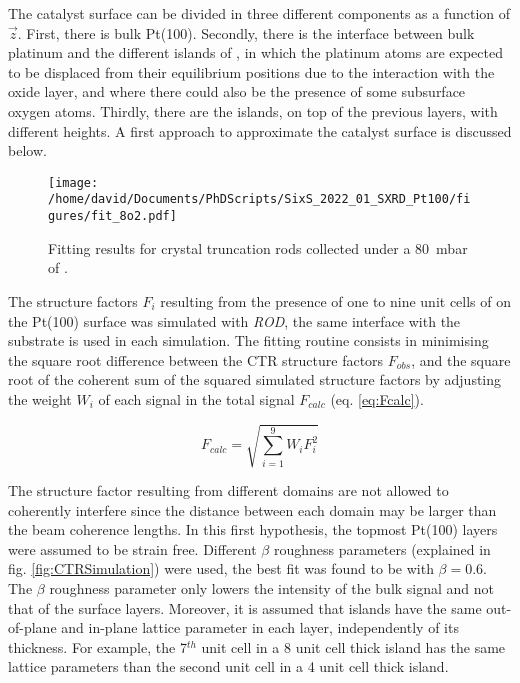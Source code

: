 The catalyst surface can be divided in three different components as a function of $\vec{z}$.
First, there is bulk Pt(100).
Secondly, there is the interface between bulk platinum and the different islands of , in which the platinum atoms are expected to be displaced from their equilibrium positions due to the interaction with the oxide layer, and where there could also be the presence of some subsurface oxygen atoms.
Thirdly, there are the  islands, on top of the previous layers, with different heights.
A first approach to approximate the catalyst surface is discussed below.

\begin{figure}[!htb]
    \centering
    \texttt{[image: /home/david/Documents/PhDScripts/SixS\_2022\_01\_SXRD\_Pt100/figures/fit\_8o2.pdf]}
    \caption{
        Fitting results for crystal truncation rods collected under a \qty{80}{\milli\bar} of .
    }
    \label{fig:CTRFitHighOxygen}
\end{figure}

The structure factors $F_i$ resulting from the presence of one to nine unit cells of  on the Pt(100) surface was simulated with \textit{ROD}, the same interface with the substrate is used in each simulation.
The fitting routine consists in minimising the square root difference between the CTR structure factors $F_{obs}$, and the square root of the coherent sum of the squared simulated structure factors by adjusting the weight $W_i$ of each signal in the total signal $F_{calc}$ (eq. \ref{eq:Fcalc}).

\begin{equation}
    F_{calc} = \sqrt{\sum_{i=1}^{9} W_i F_i^2}
    \label{eq:Fcalc}
\end{equation}

The structure factor resulting from different domains are not allowed to coherently interfere since the distance between each domain may be larger than the beam coherence lengths.
In this first hypothesis, the topmost Pt(100) layers were assumed to be strain free.
Different $\beta$ roughness parameters (explained in fig. \ref{fig:CTRSimulation}) were used, the best fit was found to be with $\beta = \num{0.6}$.
The $\beta$ roughness parameter only lowers the intensity of the bulk signal and not that of the surface layers.
Moreover, it is assumed that  islands have the same out-of-plane and in-plane lattice parameter in each layer, independently of its thickness.
For example, the 7$^{th}$ unit cell in a \num{8} unit cell thick island has the same lattice parameters than the second unit cell in a \num{4} unit cell thick island.

